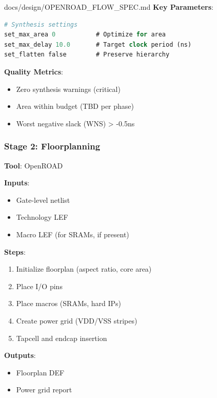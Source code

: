 \begin{relocated}{docs/design/OPENROAD_FLOW_SPEC.md}
\textbf{Key Parameters}:

\begin{lstlisting}[language=tcl]
# Synthesis settings
set_max_area 0           # Optimize for area
set_max_delay 10.0       # Target clock period (ns)
set_flatten false        # Preserve hierarchy
\end{lstlisting}

\textbf{Quality Metrics}:

\begin{itemize}
\tightlist
\item
  Zero synthesis warnings (critical)
\item
  Area within budget (TBD per phase)
\item
  Worst negative slack (WNS) \textgreater{} -0.5ns
\end{itemize}

\subsubsection{Stage 2: Floorplanning}\label{tm:pd:openroad-flow:stage-2-floorplanning}

\textbf{Tool}: OpenROAD

\textbf{Inputs}:

\begin{itemize}
\tightlist
\item
  Gate-level netlist
\item
  Technology LEF
\item
  Macro LEF (for SRAMs, if present)
\end{itemize}

\textbf{Steps}:

\begin{enumerate}
\def\labelenumi{\arabic{enumi}.}
\tightlist
\item
  Initialize floorplan (aspect ratio, core area)
\item
  Place I/O pins
\item
  Place macros (SRAMs, hard IPs)
\item
  Create power grid (VDD/VSS stripes)
\item
  Tapcell and endcap insertion
\end{enumerate}

\textbf{Outputs}:

\begin{itemize}
\tightlist
\item
  Floorplan DEF
\item
  Power grid report
\end{itemize}


\end{relocated}
